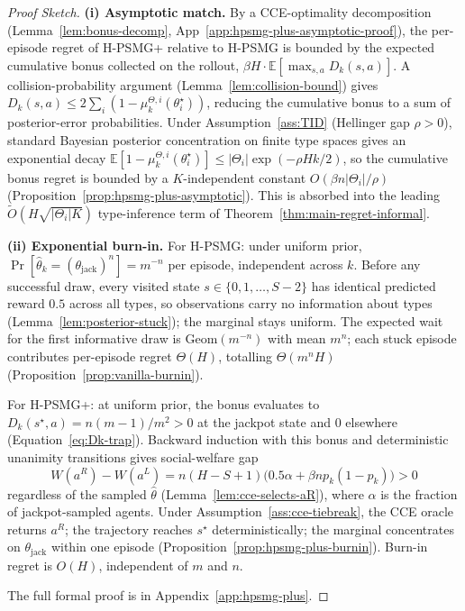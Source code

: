 \documentclass{article}
\def\textsuperscript#1{#1}%
\begin{document}
\begin{proof}[Proof Sketch]
\textbf{(i) Asymptotic match.} By a CCE-optimality decomposition (Lemma~\ref{lem:bonus-decomp}, App~\ref{app:hpsmg-plus-asymptotic-proof}), the per-episode regret of H-PSMG\textsuperscript{+} relative to H-PSMG is bounded by the expected cumulative bonus collected on the rollout, $\beta H \cdot \mathbb{E}[\max_{s,a} D_k(s, a)]$. A collision-probability argument (Lemma~\ref{lem:collision-bound}) gives $D_k(s, a) \leq 2 \sum_i (1 - \mu_k^{\Theta, i}(\theta_i^\star))$, reducing the cumulative bonus to a sum of posterior-error probabilities. Under Assumption~\ref{ass:TID} (Hellinger gap $\rho > 0$), standard Bayesian posterior concentration on finite type spaces \citep{ghosal2007convergence} gives an exponential decay $\mathbb{E}[1 - \mu_k^{\Theta, i}(\theta_i^\star)] \leq |\Theta_i| \exp(-\rho H k / 2)$, so the cumulative bonus regret is bounded by a $K$-independent constant $O(\beta n |\Theta_i| / \rho)$ (Proposition~\ref{prop:hpsmg-plus-asymptotic}). This is absorbed into the leading $\tilde O(H\sqrt{|\Theta_i| K})$ type-inference term of Theorem~\ref{thm:main-regret-informal}.

\textbf{(ii) Exponential burn-in.} For H-PSMG: under uniform prior, $\Pr[\hat\theta_k = (\theta_{\mathrm{jack}})^n] = m^{-n}$ per episode, independent across $k$. Before any successful draw, every visited state $s \in \{0, 1, \ldots, S-2\}$ has identical predicted reward $0.5$ across all types, so observations carry no information about types (Lemma~\ref{lem:posterior-stuck}); the marginal stays uniform. The expected wait for the first informative draw is $\mathrm{Geom}(m^{-n})$ with mean $m^n$; each stuck episode contributes per-episode regret $\Theta(H)$, totalling $\Theta(m^n H)$ (Proposition~\ref{prop:vanilla-burnin}).

For H-PSMG\textsuperscript{+}: at uniform prior, the bonus evaluates to $D_k(s^\star, a) = n(m-1)/m^2 > 0$ at the jackpot state and $0$ elsewhere (Equation~\ref{eq:Dk-trap}). Backward induction with this bonus and deterministic unanimity transitions gives social-welfare gap
\begin{equation*}
W(a^R) - W(a^L) = n(H - S + 1)\big(0.5\alpha + \beta n p_k(1-p_k)\big) > 0
\end{equation*}
regardless of the sampled $\hat\theta$ (Lemma~\ref{lem:cce-selects-aR}), where $\alpha$ is the fraction of jackpot-sampled agents. Under Assumption~\ref{ass:cce-tiebreak}, the CCE oracle returns $a^R$; the trajectory reaches $s^\star$ deterministically; the marginal concentrates on $\theta_{\mathrm{jack}}$ within one episode (Proposition~\ref{prop:hpsmg-plus-burnin}). Burn-in regret is $O(H)$, independent of $m$ and $n$.

The full formal proof is in Appendix~\ref{app:hpsmg-plus}.
\end{proof}
\end{document}
